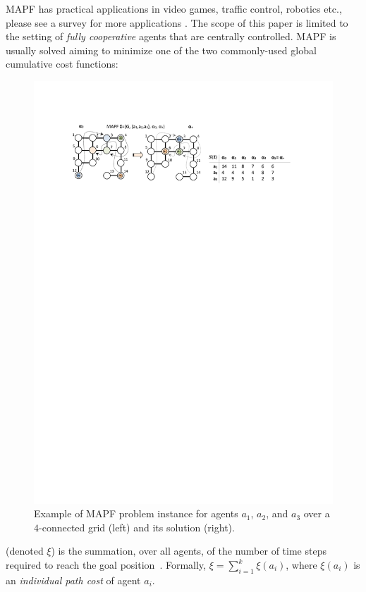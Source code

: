 \documentclass[jair,oneside,11pt]{article}
\begin{document}
MAPF has practical applications in video games, traffic control, robotics etc., please see a survey for more applications \cite{CBSJUR}. The scope of this paper is limited to the setting of {\em fully cooperative} agents that are centrally controlled. MAPF is usually solved aiming to minimize one of the two commonly-used global cumulative cost functions: \vspace{0.25cm}

\begin{figure}[t]
\centering
\includegraphics[trim={2.5cm 22.6cm 3cm 3.0cm},clip,width=1.0\textwidth]{fig_MAPF.pdf}
\caption{Example of MAPF problem instance for agents $a_1$, $a_2$, and $a_3$ over a
$4$-connected grid (left) and its solution (right).} \label{figure-MAPF}
\end{figure}

 (denoted $\xi$) is the summation, over all
agents, of the number of time steps required to reach the goal
position~\cite{dresner2008aMultiagent,DBLP:conf/aaai/Standley10,DBLP:journals/ai/SharonSGF13,CBSJUR}.
Formally, $\xi = \sum_{i=1}^k{\xi(a_i)}$, where $\xi(a_i)$ is an
\textit{individual path cost} of agent $a_i$.
\vspace{0.25cm}
\end{document}
